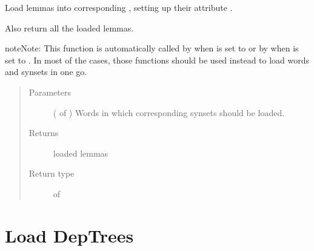 \documentclass[letterpaper,10pt,english]{sphinxmanual}
\begin{document}
\begin{fulllineitems}
\label{\detokenize{index:loacore.load.lemma_load.load_lemmas_in_words}}
Load lemmas into corresponding , setting up their attribute .

Also return all the loaded lemmas.

\begin{sphinxadmonition}{note}{Note:}
This function is automatically called by  when  is set to
 or by  when  is set to .
In most of the cases, those functions should be used instead to load words and synsets in one go.
\end{sphinxadmonition}
\begin{quote}\begin{description}
\item[{Parameters}] \leavevmode
{} ( of ) \textendash{} Words in which corresponding synsets should be loaded.

\item[{Returns}] \leavevmode
loaded lemmas

\item[{Return type}] \leavevmode
{} of 

\end{description}\end{quote}

\end{fulllineitems}



\section{Load DepTrees}
\label{\detokenize{index:module-loacore.load.deptree_load}}\label{\detokenize{index:load-deptrees}}
\end{document}
